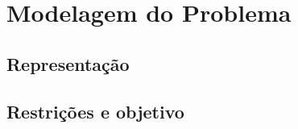 \section{Modelagem do Problema}
\label{sec:modelagem}

\lipsum[5]

\subsection{Representação}
\lipsum[6]

\subsection{Restrições e objetivo}
\lipsum[7]
